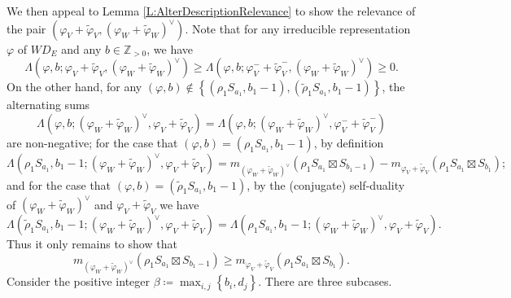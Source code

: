 \documentclass[11pt,letterpaper]{amsart}
\theoremstyle{plain}
\numberwithin{theorem}{section}
\numberwithin{equation}{subsection}
\theoremstyle{remark}
\newcommand{\Z}{\mathbb{Z}}
\begin{document}
We then appeal to Lemma \ref{L:AlterDescriptionRelevance} to show the relevance of the pair $\left(\varphi_V+\widetilde{\varphi}_V, \left(\varphi_W+\widetilde{\varphi}_W\right)^\vee\right)$. Note that for any irreducible representation $\varphi$ of $WD_E$ and any $b\in\Z_{>0}$, we have
\[
    \Lambda\left(\varphi,b;\varphi_V+\widetilde{\varphi}_V, \left(\varphi_W+\widetilde{\varphi}_W\right)^\vee\right) \geq \Lambda\left(\varphi,b;\varphi_V^-+\widetilde{\varphi}_V^-, \left(\varphi_W+\widetilde{\varphi}_W\right)^\vee\right) \geq 0.
\]
On the other hand, for any $\left(\varphi,b\right)\notin \left\{\left(\rho_1 S_{a_1}, b_1-1\right), \left(\widetilde{\rho}_1 S_{a_1}, b_1-1\right)\right\}$, the alternating sums
\[
    \Lambda\left(\varphi,b;\left(\varphi_W+\widetilde{\varphi}_W\right)^\vee,\varphi_V+\widetilde{\varphi}_V\right) = \Lambda\left(\varphi,b;\left(\varphi_W+\widetilde{\varphi}_W\right)^\vee,\varphi_V^-+\widetilde{\varphi}_V^-\right)
\]
are non-negative; for the case that $\left(\varphi,b\right) = \left(\rho_1 S_{a_1}, b_1-1\right)$, by definition
\[
    \Lambda\left(\rho_1 S_{a_1}, b_1-1;\left(\varphi_W+\widetilde{\varphi}_W\right)^\vee,\varphi_V+\widetilde{\varphi}_V\right) = m_{\left(\varphi_W+\widetilde{\varphi}_W\right)^\vee}\left(\rho_1 S_{a_1}\boxtimes S_{b_1-1}\right) - m_{\varphi_V+\widetilde{\varphi}_V}\left(\rho_1 S_{a_1}\boxtimes S_{b_1}\right);
\]
and for the case that $\left(\varphi,b\right) = \left(\widetilde{\rho}_1 S_{a_1}, b_1-1\right)$, by the (conjugate) self-duality of $\left(\varphi_W+\widetilde{\varphi}_W\right)^\vee$ and $\varphi_V+\widetilde{\varphi}_V$ we have
\[
    \Lambda\left(\widetilde{\rho}_1 S_{a_1}, b_1-1;\left(\varphi_W+\widetilde{\varphi}_W\right)^\vee,\varphi_V+\widetilde{\varphi}_V\right) = \Lambda\left(\rho_1 S_{a_1}, b_1-1;\left(\varphi_W+\widetilde{\varphi}_W\right)^\vee,\varphi_V+\widetilde{\varphi}_V\right).
\]
Thus it only remains to show that
\begin{equation}\label{E:ReductionToGoodParityOnlyIfInequality-1}
m_{\left(\varphi_W+\widetilde{\varphi}_W\right)^\vee}\left(\rho_1 S_{a_1}\boxtimes S_{b_1-1}\right) \geq m_{\varphi_V+\widetilde{\varphi}_V}\left(\rho_1 S_{a_1}\boxtimes S_{b_1}\right).   
\end{equation}
Consider the positive integer $\beta\coloneqq\max_{i,j}\left\{b_i,d_j\right\}$. There are three subcases.

\vskip 5pt
\end{document}
